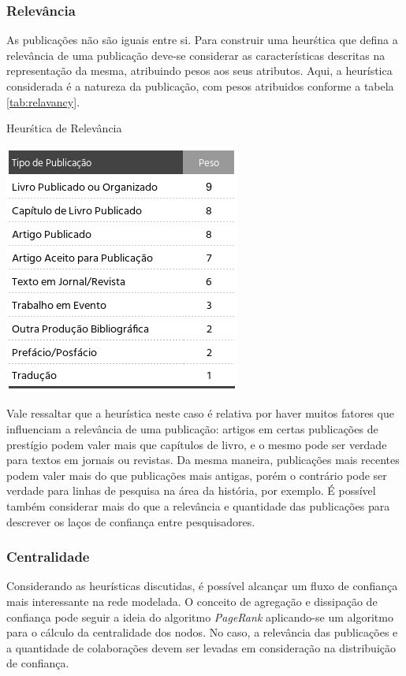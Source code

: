 \documentclass[12pt]{article}
\begin{document}
\subsubsection{Relevância} \label{sect:relevancy}

As publicações não são iguais entre si. Para construir uma heurśtica que defina a relevância de uma publicação deve-se considerar as características descritas na representação da mesma, atribuindo pesos aos seus atributos. Aqui, a heurística considerada é a natureza da publicação, com pesos atribuidos conforme 
a tabela \ref{tab:relavancy}.

\begin{center}
  \begin{table}[ht]
    \centering
    \caption{Heurśtica de Relevância}
    \label{tab:relavancy}
    \includegraphics[width=.4\textwidth]{heuristics.png}
    \end{table}
\end{center}

Vale ressaltar que a heurística neste caso é relativa por haver muitos fatores que influenciam a relevância de uma publicação: 
artigos  em certas publicações de prestígio podem valer mais que capítulos de livro, e o mesmo pode ser verdade para textos em 
jornais ou revistas. Da mesma maneira, publicações mais recentes podem valer mais do que publicações mais antigas, porém o 
contrário pode ser verdade para linhas de pesquisa na área da história, por exemplo. É possível também considerar mais do que a 
relevância e quantidade das publicações para descrever os laços de confiança entre pesquisadores.

\subsubsection{Centralidade}

Considerando as heurísticas discutidas, é possível alcançar um fluxo de confiança mais interessante na rede modelada. O conceito 
de agregação e dissipação de confiança pode seguir a ideia do algoritmo \textit{PageRank} aplicando-se um algoritmo para o 
cálculo da centralidade dos nodos. No caso, a relevância das publicações e a quantidade de colaborações devem ser levadas em 
consideração na distribuição de confiança.
\end{document}
